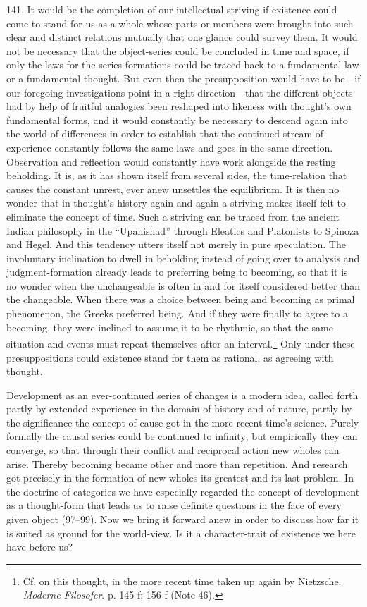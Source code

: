 \documentclass[12pt,a4paper]{book}
\newcommand{\opage}[1]{\marginnote{\footnotesize\textit{[#1]}}}
\begin{document}
141. It would be the completion of our intellectual striving if existence could come to stand for us
as a whole whose parts or members were brought into such clear and distinct relations mutually that
one glance could survey them. It would not be necessary that the object-series could be concluded in
time and space, if only the laws for the series-formations could be traced back to a fundamental law
or a fundamental thought. But even then the presupposition would have to be---if our foregoing
investigations point in a right direction---that the different objects had by help of fruitful
analogies been reshaped into likeness with thought's own fundamental forms, and it would constantly be
necessary to descend again into the world of differences in order to establish that the continued
stream of experience constantly follows the same laws and goes in the same direction. Observation and
reflection would constantly have work alongside the resting beholding. It is, as it has shown itself
from several sides, the time-relation that causes the constant unrest, ever anew unsettles the
equilibrium. It is then no wonder that in thought's history again and again a striving makes itself
felt to eliminate the concept of time. Such a striving can be traced from the ancient Indian
philosophy in the ``Upanishad'' through Eleatics and Platonists to Spinoza and Hegel. And this
tendency utters itself \opage{339}not merely in pure speculation. The involuntary inclination to dwell in
beholding instead of going over to analysis and judgment-formation already leads to preferring being to
becoming, so that it is no wonder when the unchangeable is often in and for itself considered better
than the changeable. When there was a choice between being and becoming as primal phenomenon, the
Greeks preferred being. And if they were finally to agree to a becoming, they were inclined to assume
it to be rhythmic, so that the same situation and events must repeat themselves after an
interval.\footnote{Cf. on this thought, in the more recent time taken up again by Nietzsche.
\emph{Moderne Filosofer}. p. 145 f; 156 f (Note 46).} Only under these presuppositions could existence
stand for them as rational, as agreeing with thought.

Development as an ever-continued series of changes is a modern idea, called forth partly by extended
experience in the domain of history and of nature, partly by the significance the concept of cause got
in the more recent time's science. Purely formally the causal series could be continued to infinity;
but empirically they can converge, so that through their conflict and reciprocal action new wholes can
arise. Thereby becoming became other and more than repetition. And research got precisely in the
formation of new wholes its greatest and its last problem. In the doctrine of categories we have
especially regarded the concept of development as a thought-form that leads us to raise definite
questions in the face of every given object (97--99). Now we bring it forward anew in order to discuss
how far it is suited as ground for the world-view. Is it a character-trait of existence we here have
before us?
\end{document}
